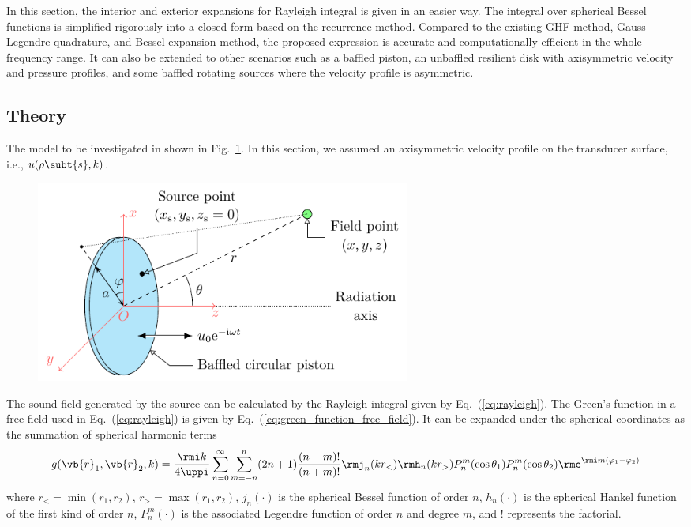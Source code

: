 In this section, the interior and exterior expansions for Rayleigh integral is given in an easier way.
The integral over spherical Bessel functions is simplified rigorously into a closed-form based on the recurrence method. 
Compared to the existing GHF method, Gauss-Legendre quadrature, and Bessel expansion method, the proposed expression is accurate and computationally efficient in the whole frequency range. 
It can also be extended to other scenarios such as a baffled piston, an unbaffled resilient disk with axisymmetric velocity and pressure profiles, and some baffled rotating sources where the velocity profile is asymmetric.

\subsection{Theory}
The model to be investigated in shown in Fig.~\ref{fig:swe_piston_sketch}.
In this section, we assumed an axisymmetric velocity profile on the transducer surface, i.e., $ u(\rho\subt{s},k)$.

\begin{figure}[!htb]
    \centering
    \includegraphics[width = 0.6\textwidth]{fig/Piston_Sketch_200923_v2.pdf}
    \caption{}
    \label{fig:swe_piston_sketch}
\end{figure}

The sound field generated by the source can be calculated by the Rayleigh integral given by Eq.~(\ref{eq:rayleigh}).
The Green's function in a free field used in Eq.~(\ref{eq:rayleigh}) is given by Eq.~(\ref{eq:green_function_free_field}).
It can be expanded under the spherical coordinates as the summation of spherical harmonic terms \cite{Zhong2020SphericalExpansionAudio}
\begin{equation}
    g(\vb{r}_1,\vb{r}_2, k)
    = 
    \frac{\rmi k }{4\uppi}
    \sum_{n =0}^{\infty} 
    \sum_{m=-n}^n 
    (2n +1)
    \frac{(n-m)!}{(n+m)!}
    \rmj_n (kr_<)
    \rmh_n(kr_>)
    P_n^m(\cos\theta_1)
    P_n^m(\cos\theta_2) \rme^{\rmi m (\varphi_1-\varphi_2)}
    \label{eq:swe_green_expansion}
\end{equation}
where $r_< = \min(r_1,r_2)$, $r_> = \max(r_1,r_2)$, $j_n(\cdot)$ is the spherical Bessel function of order $n$, $h_n(\cdot)$ is the spherical Hankel function of the first kind of order $n$, $P_n^m(\cdot)$ is the associated Legendre function of order $n$ and degree $m$, and $!$ represents the factorial.

